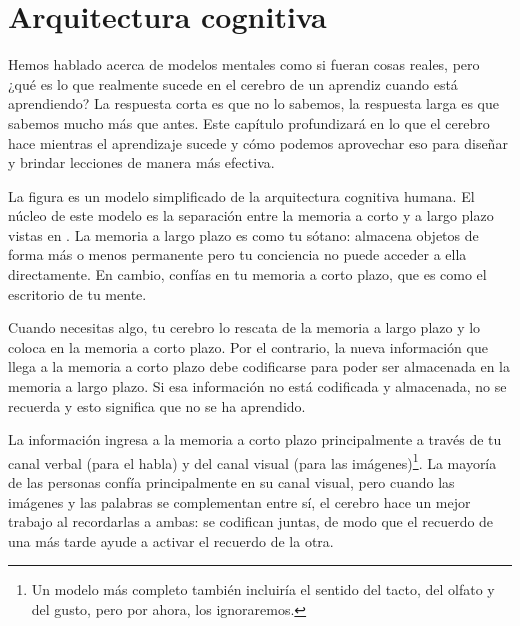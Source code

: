 \chapter{Arquitectura cognitiva}\label{s:architecture}

Hemos hablado acerca de modelos mentales como si fueran cosas reales,
pero ¿qué es lo que realmente sucede en el cerebro de un aprendiz cuando está aprendiendo?
La respuesta corta es que no lo sabemos, la respuesta larga es que sabemos mucho más que antes.
Este capítulo profundizará en lo que el cerebro hace mientras el aprendizaje sucede
y cómo podemos aprovechar eso para diseñar y brindar lecciones de manera más efectiva.



La figura  es un modelo simplificado de la arquitectura cognitiva humana. 
El núcleo de este modelo es la separación entre la memoria a corto y a largo plazo vistas en .
La memoria a largo plazo es como tu sótano:
almacena objetos de forma más o menos permanente
pero tu conciencia no puede acceder a ella directamente.
En cambio,
confías en tu memoria a corto plazo,
que es como el escritorio de tu mente.

Cuando necesitas algo,
tu cerebro lo rescata de la memoria a largo plazo  
y lo coloca en la memoria a corto plazo.
Por el contrario, la nueva información que llega a la memoria a corto plazo
debe codificarse para poder ser almacenada en la memoria a largo plazo.
Si esa información no está codificada y almacenada, no se recuerda y esto significa que  
no se ha aprendido.

La información ingresa a la memoria a corto plazo principalmente
a través de tu canal verbal (para el habla)
y del canal visual
(para las imágenes)\footnote{
  Un modelo más completo
  también incluiría el sentido del tacto, del olfato y del gusto,
  pero por ahora, los ignoraremos.}.
La mayoría de las personas confía principalmente en su canal visual,
pero cuando las imágenes y las palabras se complementan entre sí,
el cerebro hace un mejor trabajo al recordarlas a ambas:
se codifican juntas,
de modo que el recuerdo de una más tarde ayude a activar el recuerdo de la otra.

